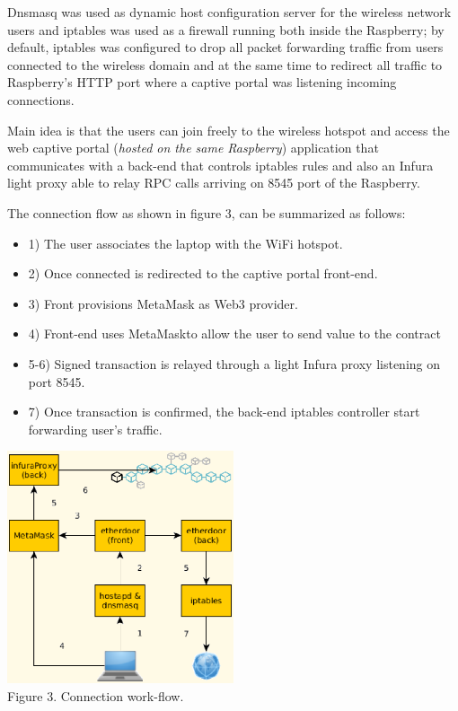 \documentclass[12pt]{amsart}
\begin{document}
\begin{multicols}{2}
\vspace{0.35cm}

Dnsmasq\cite{dnsmasq} was used
as dynamic host configuration server for the wireless
network users and
iptables\cite{iptables} was used as a firewall running
both inside the Raspberry; by default, iptables
was configured to
drop all packet
forwarding traffic from users connected to the wireless
domain and at the same time to redirect all
traffic to Raspberry's HTTP port where a
captive portal was listening incoming connections.

\vspace{0.35cm}

Main idea is that the users can join freely
to the wireless hotspot and access the web captive portal
(\textit{hosted on the same Raspberry}) application that
communicates with a back-end that controls iptables
rules and also an Infura light proxy able to relay RPC
calls arriving on 8545 port of the Raspberry.

\vspace{0.35cm}

The connection flow as shown in figure 3, can be summarized
as follows:

\begin{itemize}
\item[] 1) The user associates the laptop with the WiFi hotspot.
\item[] 2) Once connected is redirected to the captive portal front-end.
\item[] 3) Front provisions MetaMask as Web3 provider.
\item[] 4) Front-end uses MetaMaskto allow the user
  to send value to the contract
\item[] 5-6) Signed transaction is relayed through a light Infura proxy listening
  on port 8545.
\item[] 7) Once transaction is confirmed, the back-end iptables controller
  start forwarding user's traffic.
\end{itemize}

\begin{center}
  \includegraphics[keepaspectratio, width=0.5\textwidth]{images/con-flow-y.eps}
\\
Figure 3. Connection work-flow.
\\
\end{center}


\end{multicols}
\end{document}
